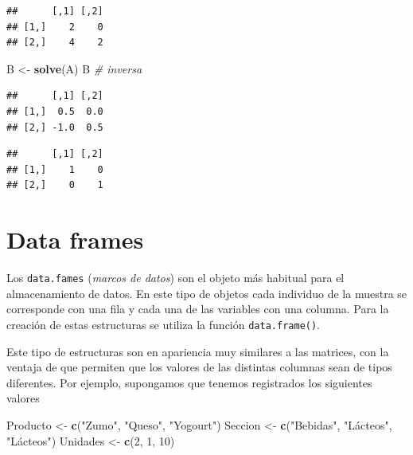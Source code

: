 \documentclass[]{book}
\newenvironment{Shaded}{\begin{snugshade}}{\end{snugshade}}
\newcommand{\CommentTok}[1]{\textcolor[rgb]{0.56,0.35,0.01}{\textit{#1}}}
\newcommand{\DecValTok}[1]{\textcolor[rgb]{0.00,0.00,0.81}{#1}}
\newcommand{\KeywordTok}[1]{\textcolor[rgb]{0.13,0.29,0.53}{\textbf{#1}}}
\newcommand{\NormalTok}[1]{#1}
\newcommand{\OperatorTok}[1]{\textcolor[rgb]{0.81,0.36,0.00}{\textbf{#1}}}
\newcommand{\StringTok}[1]{\textcolor[rgb]{0.31,0.60,0.02}{#1}}
\begin{document}
\begin{verbatim}
##      [,1] [,2]
## [1,]    2    0
## [2,]    4    2
\end{verbatim}

\begin{Shaded}
\begin{Highlighting}[]
\NormalTok{B <-}\StringTok{ }\KeywordTok{solve}\NormalTok{(A)}
\NormalTok{B  }\CommentTok{# inversa}
\end{Highlighting}
\end{Shaded}

\begin{verbatim}
##      [,1] [,2]
## [1,]  0.5  0.0
## [2,] -1.0  0.5
\end{verbatim}

\begin{Shaded}
\end{Shaded}

\begin{verbatim}
##      [,1] [,2]
## [1,]    1    0
## [2,]    0    1
\end{verbatim}

\hypertarget{data-frames}{%
\section{Data frames}\label{data-frames}}

Los \texttt{data.fames} (\emph{marcos de datos}) son el objeto más habitual para el
almacenamiento de datos. En este tipo de objetos cada individuo de la muestra
se corresponde con una fila y cada una de las variables con una columna.
Para la creación de estas estructuras se utiliza la función
\texttt{data.frame()}.

Este tipo de estructuras son en apariencia muy similares a las matrices, con la
ventaja de que permiten que los valores de las distintas columnas sean de tipos
diferentes. Por ejemplo, supongamos que tenemos registrados los siguientes valores

\begin{Shaded}
\begin{Highlighting}[]
\NormalTok{Producto <-}\StringTok{ }\KeywordTok{c}\NormalTok{(}\StringTok{"Zumo"}\NormalTok{, }\StringTok{"Queso"}\NormalTok{, }\StringTok{"Yogourt"}\NormalTok{)}
\NormalTok{Seccion <-}\StringTok{ }\KeywordTok{c}\NormalTok{(}\StringTok{"Bebidas"}\NormalTok{, }\StringTok{"Lácteos"}\NormalTok{, }\StringTok{"Lácteos"}\NormalTok{)}
\NormalTok{Unidades <-}\StringTok{ }\KeywordTok{c}\NormalTok{(}\DecValTok{2}\NormalTok{, }\DecValTok{1}\NormalTok{, }\DecValTok{10}\NormalTok{)}
\end{Highlighting}
\end{Shaded}
\end{document}
